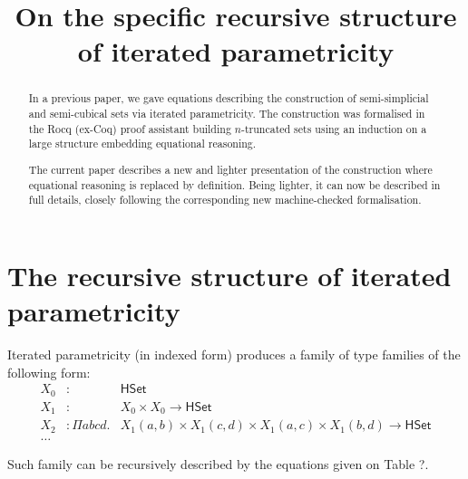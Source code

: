\documentclass{article}
\newcommand{\U}{\ensuremath{\mathsf{{HSet}}}}
\begin{document}
\title{On the specific recursive structure of iterated parametricity}

\maketitle

\begin{abstract}
  In a previous paper, we gave equations describing the construction
  of semi-simplicial and semi-cubical sets via iterated parametricity.
  The construction was formalised in the Rocq (ex-Coq) proof assistant
  building $n$-truncated sets using an induction on a large structure
  embedding equational reasoning.

  The current paper describes a new and lighter presentation of the
  construction where equational reasoning is replaced by
  definition. Being lighter, it can now be described in full details,
  closely following the corresponding new machine-checked
  formalisation.
\end{abstract}

\section{The recursive structure of iterated parametricity}
Iterated parametricity (in indexed form) produces a family of type
families of the following form:
\begin{equation*}
  \begin{array}{llr}
    X_0 & :              & \U                                                                        \\
    X_1 & :              & X_0 \times X_0 \rightarrow  \U                                            \\
    X_2 & : \Pi a b c d. & X_1(a,b) \times X_1 (c,d) \times X_1(a,c) \times X_1 (b,d) \rightarrow \U \\
    \ldots
  \end{array}
\end{equation*}

Such family can be recursively described by the equations given on Table ?.
\end{document}
